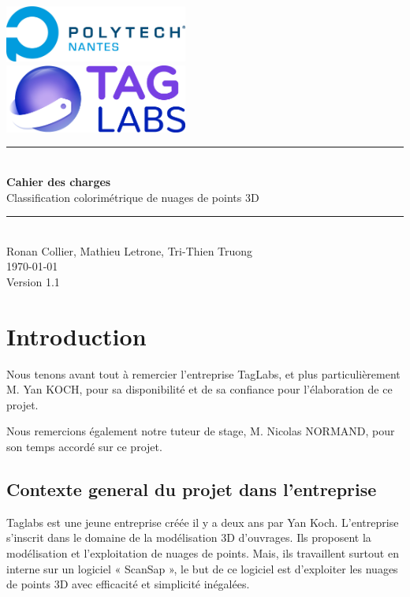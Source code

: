\documentclass[12pt,titlepage,french]{article}
\begin{document}

\begin{titlepage}
\newcommand{\HRule}{\rule{\linewidth}{0.5mm}}
\center

  \includegraphics[width=0.45\textwidth]{./image2.png}\\[1cm]
   
  \includegraphics[width=0.45\textwidth]{./image1.png}


\HRule \\[0.4cm]
{ \huge \bfseries Cahier des charges \\[0.15cm] }
Classification colorimétrique de nuages de points 3D
\HRule \\[1.5cm]
Ronan Collier,
Mathieu Letrone,
Tri-Thien Truong
\\[1cm]
\today \\ [1cm]
Version 1.1
\end{titlepage}

\section{Introduction}

Nous tenons avant tout à remercier l'entreprise TagLabs, et plus particulièrement M. Yan KOCH, pour sa disponibilité et de sa confiance pour l'élaboration de ce projet.

Nous remercions également notre tuteur de stage, M. Nicolas NORMAND, pour son temps accordé sur ce projet.

\subsection*{Contexte general du projet dans l'entreprise}

Taglabs est une jeune entreprise créée il y a deux ans par Yan Koch. L’entreprise s’inscrit dans le domaine de la modélisation 3D d’ouvrages. Ils proposent la modélisation et l’exploitation de nuages de points. Mais, ils travaillent surtout en interne sur un logiciel « ScanSap », le but de ce logiciel est d’exploiter les nuages de points 3D avec efficacité et simplicité inégalées.
\end{document}
